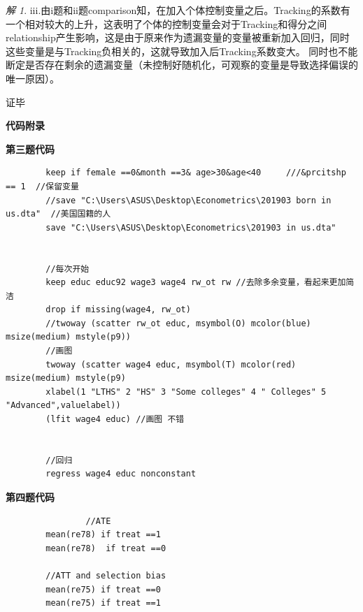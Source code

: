 \documentclass[a4paper]{ctexart}
\theoremstyle{remark}
\newtheorem*{solution}{解}
\renewcommand{\qedsymbol}{证毕}
\begin{document}
\begin{itemize}
\begin{solution}
    iii.由i题和ii题comparison知，在加入个体控制变量之后。Tracking的系数有一个相对较大的上升，这表明了个体的控制变量会对于Tracking和得分之间relationship产生影响，这是由于原来作为遗漏变量的变量被重新加入回归，同时这些变量是与Tracking负相关的，这就导致加入后Tracking系数变大。
    同时也不能断定是否存在剩余的遗漏变量（未控制好随机化，可观察的变量是导致选择偏误的唯一原因）。

    \qedsymbol


\end{solution}

\newpage
{\fontsize{14pt}{16pt}\selectfont \textbf{代码附录}}

{\fontsize{8pt}{12pt}\selectfont \textbf{第三题代码}}
\lstset{language=Python,basicstyle=\ttfamily\small}
    \begin{lstlisting}
        keep if female ==0&month ==3& age>30&age<40     ///&prcitshp == 1  //保留变量
        //save "C:\Users\ASUS\Desktop\Econometrics\201903 born in us.dta"  //美国国籍的人
        save "C:\Users\ASUS\Desktop\Econometrics\201903 in us.dta"


        //每次开始
        keep educ educ92 wage3 wage4 rw_ot rw //去除多余变量，看起来更加简洁    
        drop if missing(wage4, rw_ot)
        //twoway (scatter rw_ot educ, msymbol(O) mcolor(blue) msize(medium) mstyle(p9)) 
        //画图
        twoway (scatter wage4 educ, msymbol(T) mcolor(red) msize(medium) mstyle(p9)
        xlabel(1 "LTHS" 2 "HS" 3 "Some colleges" 4 " Colleges" 5 "Advanced",valuelabel))
        (lfit wage4 educ) //画图 不错


        //回归
        regress wage4 educ nonconstant
    \end{lstlisting}

{\fontsize{8pt}{12pt}\selectfont \textbf{第四题代码}}
    \begin{lstlisting}
                //ATE
        mean(re78) if treat ==1 
        mean(re78)  if treat ==0

        //ATT and selection bias
        mean(re75) if treat ==0
        mean(re75) if treat ==1 




\end{lstlisting}
\end{itemize}
\end{document}
